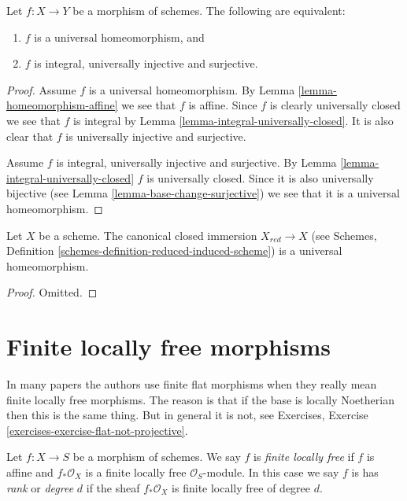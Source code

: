 \begin{lemma}
\label{lemma-universal-homeomorphism}
Let $f : X \to Y$ be a morphism of schemes. The following are
equivalent:
\begin{enumerate}
\item $f$ is a universal homeomorphism, and
\item $f$ is integral, universally injective and surjective.
\end{enumerate}
\end{lemma}

\begin{proof}
Assume $f$ is a universal homeomorphism. By
Lemma \ref{lemma-homeomorphism-affine}
we see that $f$ is affine. Since $f$ is clearly universally closed we
see that $f$ is integral by
Lemma \ref{lemma-integral-universally-closed}.
It is also clear that $f$ is universally injective and surjective.

\medskip\noindent
Assume $f$ is integral, universally injective and surjective. By
Lemma \ref{lemma-integral-universally-closed}
$f$ is universally closed. Since it is also universally bijective (see
Lemma \ref{lemma-base-change-surjective})
we see that it is a universal homeomorphism.
\end{proof}

\begin{lemma}
\label{lemma-reduction-universal-homeomorphism}
Let $X$ be a scheme. The canonical closed immersion $X_{red} \to X$ (see
Schemes, Definition \ref{schemes-definition-reduced-induced-scheme})
is a universal homeomorphism.
\end{lemma}

\begin{proof}
Omitted.
\end{proof}







\section{Finite locally free morphisms}
\label{section-finite-locally-free}

\noindent
In many papers the authors use finite flat morphisms when they really mean
finite locally free morphisms. The reason is that if the base is locally
Noetherian then this is the same thing. But in general it is not, see
Exercises, Exercise \ref{exercises-exercise-flat-not-projective}.

\begin{definition}
\label{definition-finite-locally-free}
Let $f : X \to S$ be a morphism of schemes.
We say $f$ is {\it finite locally free} if $f$ is
affine and $f_*\mathcal{O}_X$ is a finite locally
free $\mathcal{O}_S$-module. In this case we say $f$ is
has {\it rank} or {\it degree} $d$
if the sheaf $f_*\mathcal{O}_X$ is finite locally free of degree $d$.
\end{definition}


